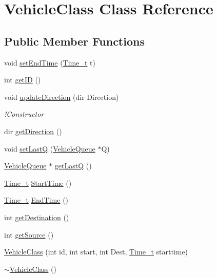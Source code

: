 \hypertarget{class_vehicle_class}{\section{Vehicle\-Class Class Reference}
\label{class_vehicle_class}
}
\subsection*{Public Member Functions}
\begin{DoxyCompactItemize}
\item 
void \hyperlink{class_vehicle_class_a127372b94980fa045c648af412856fd5}{set\-End\-Time} (\hyperlink{_common_defs_8h_a80b23eab88362163e2edd1a8b8238ef1}{Time\-\_\-t} t)
\item 
int \hyperlink{class_vehicle_class_a8f00863bdcac1822d486c3d119ff1340}{get\-I\-D} ()
\item 
void \hyperlink{class_vehicle_class_a7070e6f4e7814a6f81292a54aa3c58b5}{update\-Direction} (dir Direction)
\begin{DoxyCompactList}\small\item\em !\-Constructor \end{DoxyCompactList}\item 
dir \hyperlink{class_vehicle_class_a107f9787110e3a575facf1975e40a7b2}{get\-Direction} ()
\item 
void \hyperlink{class_vehicle_class_af0e593cd2608561e6596ae61bbc0b62f}{set\-Last\-Q} (\hyperlink{class_vehicle_queue}{Vehicle\-Queue} $\ast$Q)
\item 
\hyperlink{class_vehicle_queue}{Vehicle\-Queue} $\ast$ \hyperlink{class_vehicle_class_a2d35acee350ca16bbadd8ff048956351}{get\-Last\-Q} ()
\item 
\hyperlink{_common_defs_8h_a80b23eab88362163e2edd1a8b8238ef1}{Time\-\_\-t} \hyperlink{class_vehicle_class_a53459527cf013f8e9fac5543c9817b99}{Start\-Time} ()
\item 
\hyperlink{_common_defs_8h_a80b23eab88362163e2edd1a8b8238ef1}{Time\-\_\-t} \hyperlink{class_vehicle_class_a91a7fa343d550e90de5e921550ec0c33}{End\-Time} ()
\item 
int \hyperlink{class_vehicle_class_a2158372213aad34b03a4d8021e1dbd1d}{get\-Destination} ()
\item 
int \hyperlink{class_vehicle_class_aa1e4f513ff1cf84e577f3c6e8bcd681f}{get\-Source} ()
\item 
\hyperlink{class_vehicle_class_ae4291311ac5253a754310588100c494a}{Vehicle\-Class} (int id, int start, int Dest, \hyperlink{_common_defs_8h_a80b23eab88362163e2edd1a8b8238ef1}{Time\-\_\-t} starttime)
\item 
\hyperlink{class_vehicle_class_a5e06ff66b19ecd516f549e7f78feeb44}{$\sim$\-Vehicle\-Class} ()
\end{DoxyCompactItemize}
